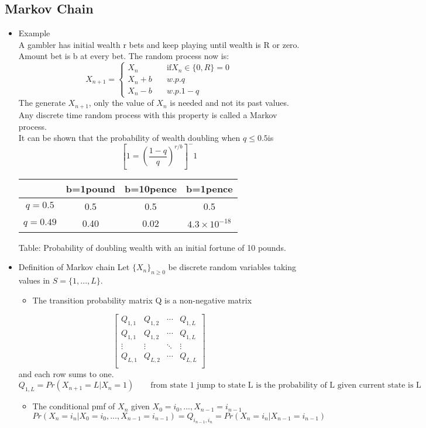 \documentclass[12pt]{article}
\begin{document}
\subsection{Markov Chain}
\begin{itemize}
\item Example \\
A gambler has initial wealth r bets and keep playing until wealth is R or zero. Amount bet is b at every bet. The random process now is:
\[
X_{n+1} = \left\{ \begin{array}{ll}
					X_n \quad & \textrm{if} X_n \in \{0,R \}=0 \\
					X_n + b \quad & w.p. q \\
					X_n - b \quad & w.p. 1-q
\end{array} \right.
\] 
The generate $X_{n+1}$, only the value of $X_n$ is needed and not its past values. Any discrete time random process with this property is called a Markov process. \\
It can be shown that the probability of wealth doubling when $q \le 0.5$is 
\[
\left[ 1 = \left(\frac{1-q}{q}\right)^{r/b}\right]^-1
\]

\begin{tabular}{ |c|c|c|c|} 
\hline
 & b=1pound & b=10pence  & b=1pence\\
\hline
\hline
$q=0.5$ & 0.5 & 0.5 & 0.5 \\ 
$q=0.49$ & 0.40 & 0.02 & $4.3 \times 10^{-18}$\\ 
\hline
\end{tabular}
Table: Probability of doubling wealth with an initial fortune of 10 pounds.

\item Definition of Markov chain Let $\{ X_n\}_{n \ge 0}$ be discrete random variables taking values in $S = \{1,...,L \}.$
\begin{itemize}
\item The transition probability matrix Q is a non-negative matrix 
\end{itemize}

\[
\begin{bmatrix}
Q_{1,1 } & Q_{1,2} & \cdots & Q_{1,L} \\
Q_{1,1 } & Q_{1,2} & \cdots & Q_{1,L} \\
\vdots & \vdots & \ddots & \vdots \\
Q_{L,1 } & Q_{L,2} & \cdots & Q_{L,L} \\
\end{bmatrix}
\]
and each row sums to one.
\[
Q_{1,L} = Pr(X_{n+1}=L | X_n = 1) \qquad \textrm{from state 1 jump to state L is the probability of L given  current state is L}
\]
\begin{itemize}
\item The conditional pmf of $X_n$ given $X_0=i_0,...,X_{n-1}=i_{n-1}$
\[Pr(X_n =i_n | X_0=i_0,...,X_{n-1}=i_{n-1}) = Q_{i_{n-1},i_n} = Pr(X_n =i_n | X_{n-1}=i_{n-1})
\]
\end{itemize}


\end{itemize}
\end{document}

